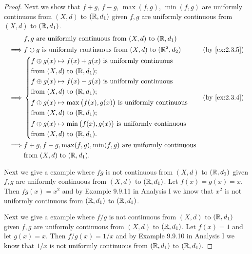 \begin{proof}
  Next we show that \(f + g\), \(f - g\), \(\max(f, g)\), \(\min(f, g)\) are uniformly continuous from \((X, d)\) to \((\mathbb{R}, d_1)\) given \(f, g\) are uniformly continuous from \((X, d)\) to \((\mathbb{R}, d_1)\).
  \begin{align*}
             & f, g \text{ are uniformly continuous from } (X, d) \text{ to } (\R, d_1)                                           \\
    \implies & f \oplus g \text{ is uniformly continuous from } (X, d) \text{ to } (\R^2, d_2)   &  & \text{(by \cref{ex:2.3.5})} \\
    \implies & \begin{dcases}
                 f \oplus g(x) \mapsto f(x) + g(x) \text{ is uniformly continuous}              \\
                 \text{from } (X, d) \text{ to } (\R, d_1);                                     \\
                 f \oplus g(x) \mapsto f(x) - g(x) \text{ is uniformly continuous}              \\
                 \text{from } (X, d) \text{ to } (\R, d_1);                                     \\
                 f \oplus g(x) \mapsto \max\big(f(x), g(x)\big) \text{ is uniformly continuous} \\
                 \text{from } (X, d) \text{ to } (\R, d_1);                                     \\
                 f \oplus g(x) \mapsto \min\big(f(x), g(x)\big) \text{ is uniformly continuous} \\
                 \text{from } (X, d) \text{ to } (\R, d_1).
               \end{dcases} &  & \text{(by \cref{ex:2.3.4})}                                     \\
    \implies & f + g, f - g, \max(f, g), \min(f, g) \text{ are uniformly continuous}                                              \\
             & \text{from } (X, d) \text{ to } (\R, d_1).
  \end{align*}

  Next we give a example where \(fg\) is not continuous from \((X, d)\) to \((\mathbb{R}, d_1)\) given \(f, g\) are uniformly continuous from \((X, d)\) to \((\mathbb{R}, d_1)\).
  Let \(f(x) = g(x) = x\).
  Then \(fg(x) = x^2\) and by Example 9.9.11 in Analysis I we know that \(x^2\) is not uniformly continuous from \((\mathbb{R}, d_1)\) to \((\mathbb{R}, d_1)\).

  Next we give a example where \(f / g\) is not continuous from \((X, d)\) to \((\mathbb{R}, d_1)\) given \(f, g\) are uniformly continuous from \((X, d)\) to \((\mathbb{R}, d_1)\).
  Let \(f(x) = 1\) and let \(g(x) = x\).
  Then \(f / g(x) = 1 / x\) and by Example 9.9.10 in Analysis I we know that \(1 / x\) is not uniformly continuous from \((\mathbb{R}, d_1)\) to \((\mathbb{R}, d_1)\).


\end{proof}
